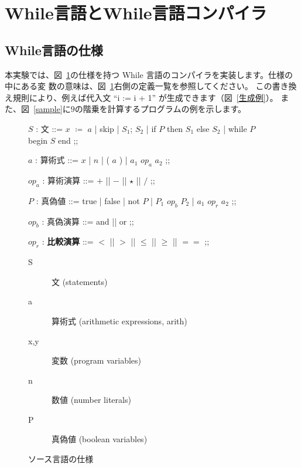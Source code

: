\documentclass[a4paper,11pt]{jsarticle}
\begin{document}
\section{While言語とWhile言語コンパイラ}
\label{sec:while_lang}

\subsection{While言語の仕様}

本実験では、図~\ref{spec}の仕様を持つ While 言語のコンパイラを実装します。仕様の中にある変
数の意味は、図~\ref{spec}右側の定義一覧を参照してください。
この書き換え規則により、例えば代入文 ``\textsf{i := i + 1}'' が生成できます（図~\ref{生成例}）。
また、図~\ref{sample}に$9$の階乗を計算するプログラムの例を示します。

\begin{figure}[H]
  \centering
  \begin{minipage}[t]{0.6\linewidth}

    \begin{bnf}
      $S$ : \textsf{文} ::= $x$ $\coloneq$ $a$
      | skip
      | $S_1$; $S_2$
      | if $P$ then $S_1$ else $S_2$
      | while $P$ begin $S$ end
      ;;

      $a$ : \textsf{算術式} ::= $x$
      | $n$
      | ( $a$ )
      | $a_1$ $op_a$ $a_2$
      ;;

      $op_a$ : \textsf{算術演算} ::= $+$ || $-$ || $\star$ || $/$
      ;;

      $P$ : \textsf{真偽値} ::= true
      | false
      | not $P$
      | $P_1$ $op_b$ $P_2$
      | $a_1$ $op_r$ $a_2$
      ;;

      $op_b$ : \textsf{真偽演算} ::= and || or
      ;;

      $op_r$ : \textbf{比較演算} ::= $<$ || $>$ || $\leq$ || $\geq$ || $==$
      ;;
    \end{bnf}
  \end{minipage}
  \begin{minipage}[t]{0.3\linewidth}
    \begin{description}
    \item[S] 文 (statements)
    \item[a] 算術式 (arithmetic expressions, arith)
    \item[x,y] 変数 (program variables)
    \item[n] 数値 (number literals)
    \item[P] 真偽値 (boolean variables)
    \end{description}
  \end{minipage}

  \caption{ソース言語の仕様}\label{spec}
\end{figure}
\end{document}
